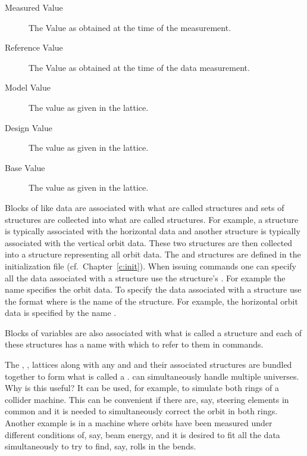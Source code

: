 \begin{description}
\begin{description}
\item[Measured Value] 
The Value as obtained at the time of the  measurement.
\item[Reference Value] 
The Value as obtained at the time of the  data  measurement.
\item[Model Value]
The value as given in the  lattice.
\item[Design Value]
The value as given in the  lattice.
\item[Base Value]
The value as given in the  lattice.
\end{description}
\end{description}

Blocks of like data are associated with what are called 
structures and sets of  structures are collected into what
are called  structures. For example, a 
structure is typically associated with the horizontal data and another
 structure is typically associated with the vertical orbit
data. These two structures are then collected into a 
structure representing all orbit data. The  and
 structures are defined in the \tao initialization file
(cf.~Chapter~\ref{c:init}).  When issuing \tao commands one can
specify all the data associated with a  structure use the
structure's .  For example the name  specifies the
orbit data. To specify the data associated with a 
structure use the format  where  is the
 name of the  structure. For example, the horizontal
orbit data is specified by the name .

Blocks of variables are also associated with what is called a
 structure and each of these structures has a 
name with which to refer to them in \tao commands.

The , ,  lattices along with any
 and  and their associated structures are
bundled together to form what is called a . \tao can
simultaneously handle multiple universes. Why is this useful? It can
be used, for example, to simulate both rings of a collider
machine. This can be convenient if there are, say, steering elements
in common and it is needed to simultaneously correct the orbit in both
rings. Another example is in a machine where orbits have been measured
under different conditions of, say, beam energy, and it is desired to
fit all the data simultaneously to try to find, say, rolls in the
bends.

